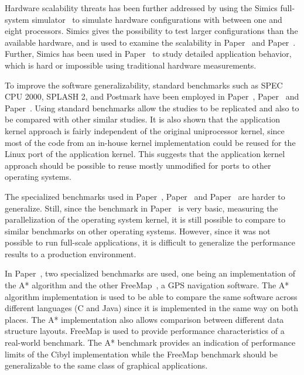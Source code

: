 Hardware scalability threats has been further addressed by using the Simics
full-system simulator~\cite{simics} to simulate hardware configurations with
between one and eight processors. Simics gives the possibility to test larger
configurations than the available hardware, and is used to examine the
scalability in Paper~ and Paper~.
Further, Simics has been used in Paper~ to study detailed
application behavior, which is hard or impossible using traditional hardware
measurements.

To improve the software generalizability, standard benchmarks such as SPEC CPU
2000, SPLASH 2, and Postmark have been employed in
Paper~, Paper~ and
Paper~. Using standard benchmarks allow the studies to be
replicated and also to be compared with other similar studies.  It is also
shown that the application kernel approach is fairly independent of the
original uniprocessor kernel, since most of the code from an in-house kernel
implementation could be reused for the Linux port of the application kernel.
This suggests that the application kernel approach should be possible to reuse
mostly unmodified for ports to other operating systems.

The specialized benchmarks used in Paper~,
Paper~ and Paper~ are harder to
generalize. Still, since the benchmark in Paper~ is
very basic, measuring the parallelization of the operating system kernel, it
is still possible to compare to similar benchmarks on other operating systems.
However, since it was not possible to run full-scale applications, it is
difficult to generalize the performance results to a production environment.

In Paper~, two specialized benchmarks are used,
one being an implementation of the A* algorithm and the other
FreeMap~\cite{shabtai07roadmap}, a GPS navigation software. The A* algorithm
implementation is used to be able to compare the same software across
different languages (C and Java) since it is implemented in the same way on
both places. The A* implementation also allows comparison between different
data structure layouts. FreeMap is used to provide performance characteristics
of a real-world benchmark. The A* benchmark provides an indication of
performance limits of the Cibyl implementation while the FreeMap benchmark
should be generalizable to the same class of graphical applications.

